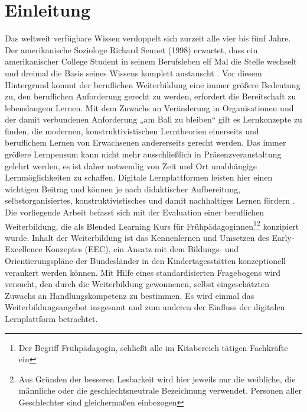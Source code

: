 \documentclass[12pt,smallheadings, bibliography=totoc]{scrartcl}
\begin{document}
%
\tableofcontents
\listoftables
\listoffigures
\clearpage
\pagebreak
{}
\section{Einleitung}\label{einleitung}

\glqq Das weltweit verfügbare Wissen verdoppelt sich zurzeit alle vier
bis fünf Jahre. Der amerikanische Soziologe Richard Sennet (1998)
erwartet, dass ein amerikanischer College Student in seinem Berufsleben
elf Mal die Stelle wechselt und dreimal die Basis seines Wissens
komplett austauscht \parencite[138]{Ehlers2002}.\grqq{} Vor diesem
Hintergrund kommt der beruflichen Weiterbildung eine immer größere
Bedeutung zu, den beruflichen Anforderung gerecht zu werden, erfordert
die Bereitschaft zu lebenslangem Lernen. Mit dem Zuwachs an Veränderung
in Organisationen und der damit verbundenen Anforderung „am Ball zu
bleiben`` gilt es Lernkonzepte zu finden, die modernen,
konstruktivistischen Lerntheorien einerseits und beruflichem Lernen von
Erwachsenen andererseits gerecht werden. Das immer größere Lernpensum
kann nicht mehr ausschließlich in Präsenzveranstaltung gelehrt werden,
es ist daher notwendig von Zeit und Ort unabhängige Lernmöglichkeiten zu
schaffen. Digitale Lernplattformen leisten hier einen wichtigen Beitrag
und können je nach didaktischer Aufbereitung, selbstorganisiertes,
konstruktivistisches und damit nachhaltiges Lernen fördern
\parencite{Kerres2002}. Die vorliegende Arbeit befasst sich mit der
Evaluation einer beruflichen Weiterbildung, die als Blended Learning
Kurs für
Frühpädagoginnen\footnote{Der Begriff Frühpädagogin, schließt alle im Kitabereich tätigen Fachkräfte ein}\footnote{Aus Gründen der besseren Lesbarkeit wird hier jeweils nur die weibliche, die männliche oder die geschlechtsneutrale Bezeichnung verwendet. Personen aller Geschlechter sind gleichermaßen einbezogen}
konzipiert wurde. Inhalt der Weiterbildung ist das Kennenlernen und
Umsetzen des Early-Excellence Konzeptes (EEC), ein Ansatz mit dem
Bildungs- und Orientierungspläne der Bundesländer in den
Kindertagesstätten konzeptionell verankert werden können. Mit Hilfe
eines standardisierten Fragebogens wird versucht, den durch die
Weiterbildung gewonnenen, selbst eingeschätzten Zuwachs an
Handlungskompetenz zu bestimmen. Es wird einmal das
Weiterbildungsangebot insgesamt und zum anderen der Einfluss der
digitalen Lernplattform betrachtet.
\end{document}
